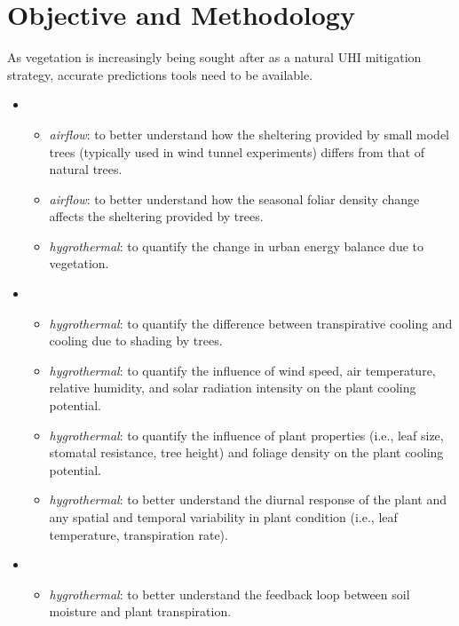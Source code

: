 \section{Objective and Methodology}

As vegetation is increasingly being sought after as a natural UHI mitigation strategy, accurate predictions tools need to be available. 

\begin{itemize}
	\item {}
	\begin{itemize}
		\item \textit{airflow}: to better understand how the sheltering provided by small model trees (typically used in wind tunnel experiments) differs from that of natural trees.
		\item \textit{airflow}: to better understand how the seasonal foliar density change affects the sheltering provided by trees.
		\item \textit{hygrothermal}: to quantify the change in urban energy balance due to vegetation.
	\end{itemize}
	\item {}
		\begin{itemize}
		\item \textit{hygrothermal}: to quantify the difference between transpirative cooling and cooling due to shading by trees.
			\item \textit{hygrothermal}: to quantify the influence of wind speed, air temperature, relative humidity, and solar radiation intensity on the plant cooling potential.					
			\item \textit{hygrothermal}: to quantify the influence of plant properties (i.e., leaf size, stomatal resistance, tree height) and foliage density on the plant cooling potential.			
			\item \textit{hygrothermal}: to better understand the diurnal response of the plant and any spatial and temporal variability in plant condition (i.e., leaf temperature, transpiration rate).	
		\end{itemize}		
	\item {}
		\begin{itemize}
			\item \textit{hygrothermal}: to better understand the feedback loop between soil moisture and plant transpiration.			

\end{itemize}
\end{itemize}
